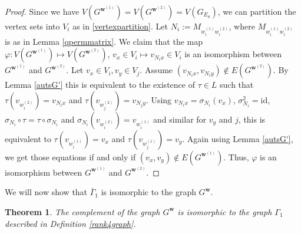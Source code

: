 \documentclass[11pt]{article}
\newtheorem{theo}{Theorem}[section]
\theoremstyle{definition}
\numberwithin{equation}{section}
\begin{document}
\begin{proof}
Since we have $V(G^{\boldsymbol{w}^{(1)}})=V(G^{\boldsymbol{w}^{(2)}})=V(G_{E_8})$, we can partition the vertex sets into $V_i$ as in \eqref{vertexpartition}. Let $N_i:=M_{w_i^{(1)}w_i^{(2)}}$, where $M_{w_i^{(1)}w_i^{(2)}}$ is as in Lemma \ref{qpermmatrix}. We claim that the map $\varphi:V(G^{\boldsymbol{w}^{(1)}})\mapsto V(G^{\boldsymbol{w}^{(2)}})$, $v_x \in V_i\mapsto v_{N_ix}\in V_i$ is an isomorphism between $G^{\boldsymbol{w}^{(1)}}$ and $G^{\boldsymbol{w}^{(2)}}$. Let $v_x\in V_i, v_y\in  V_j$. Assume $(v_{N_ix}, v_{N_iy})\notin E(G^{\boldsymbol{w}^{(2)}})$. By Lemma \ref{autsG'} this is equivalent to the existence of $\tau \in L$ such that $\tau(v_{w_i^{(2)}})=v_{N_ix}$ and $\tau(v_{w_j^{(2)}})=v_{N_jy}$. Using $v_{N_ix}=\sigma_{N_i}(v_x)$, $\sigma_{N_i}^2=\mathrm{id}$,  $\sigma_{N_i}\circ \tau=\tau \circ \sigma_{N_i}$ and $\sigma_{N_i}(v_{w_i^{(2)}})=v_{w_i^{(1)}}$ and similar for $v_y$ and $j$, this is equivalent to $\tau(v_{w_i^{(1)}})=v_x$ and $\tau(v_{w_j^{(1)}})=v_y$. Again using Lemma \ref{autsG'}, we get those equations if and only if $(v_x,v_y)\notin E(G^{\boldsymbol{w}^{(1)}})$. Thus, $\varphi$ is an isomorphism between $G^{\boldsymbol{w}^{(1)}}$ and $G^{\boldsymbol{w}^{(2)}}$. 
\end{proof}

We will now show that $\overline{\Gamma}_1$ is isomorphic to the graph $G^{\boldsymbol{w}}$. 

\begin{theo}\label{isographs}
The complement of the graph $G^{\boldsymbol{w}}$ is isomorphic to the graph $\Gamma_1$ described in Definition \ref{rank4graph}.
\end{theo}
\end{document}
